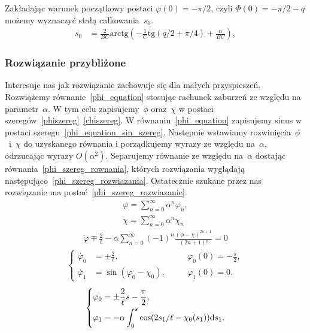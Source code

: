 Zakładając warunek początkowy postaci $\varphi(0) = -\pi/2$, 
czyli $\Phi(0) = -\pi/2 - q$ możemy wyznaczyć stałą całkowania~$s_0$.
\begin{align*}
s_0 & = \frac{2}{BC} \text{arctg}  
\left( - \frac{1}{C}\text{tg} (q/2 + \pi/4) +\frac{\alpha}{BC} \right),
\end{align*}

\newpage
\subsubsection{Rozwiązanie przybliżone}
Interesuje nas jak rozwiązanie zachowuje się dla małych przyspieszeń. 
Rozwiążemy równanie~\eqref{phi_equation} stosując 
rachunek zaburzeń ze względu na 
parametr~$\alpha$. W tym celu zapisujemy~$\phi$ oraz~$\chi$ w postaci
szeregów~\eqref{phiszereg}~\eqref{chiszereg}. 
W równaniu~\eqref{phi_equation} zapisujemy sinus w postaci 
szeregu~\eqref{phi_equation_sin_szereg}. Następnie wstawiamy 
rozwinięcia~$\phi$~i~$\chi$ do uzyskanego równania i porządkujemy wyrazy
ze względu na~$\alpha$, odrzucając wyrazy $O(\alpha^2)$. 
Separujemy równanie ze względu na~$\alpha$ dostając 
równania~\eqref{phi_szereg_rownania}, 
których rozwiązania wyglądają 
następująco~\eqref{phi_szereg_rozwiazania}.
Ostatecznie szukane przez nas rozwiązanie ma 
postać~\eqref{phi_szereg_rozwiazanie}.
\begin{align}\label{phiszereg}
\varphi = \sum_{n=0}^{\infty} \alpha^n \varphi_n, \\
\chi = \sum_{n=0}^{\infty} \alpha^n \chi_n  \label{chiszereg}
\end{align}
\begin{align}\label{phi_equation_sin_szereg}
\dot{\varphi} \mp \frac{2}{\ell} - \alpha
\sum_{n=0}^{\infty} (-1)^n \frac{(\phi-\chi)^{2n+1}}{(2n+1)!} =0
\end{align}
\begin{align}\label{phi_szereg_rownania}
\left\{ 
\begin{aligned}
\dot{\varphi_0} & = \pm \frac{2}{\ell} , &\quad & 
\varphi_0(0)=-\frac{\pi}{2},\\
\dot{\varphi_1} & = \sin (\varphi_0 - \chi_0  ), &\quad & 
\varphi_1(0) = 0 .
\end{aligned}
\right.
\end{align}
\begin{align}\label{phi_szereg_rozwiazania}
\left\{ 
\begin{aligned}
\varphi_0 & =  \pm \frac{2}{\ell}s - \frac{\pi}{2},\\
\varphi_1 & =  -\alpha \int_0^s \cos 
(2 s_1 / \ell  - \chi_0(s_1)  ) \text{d} s_1 .
\end{aligned}
\right.
\end{align}
